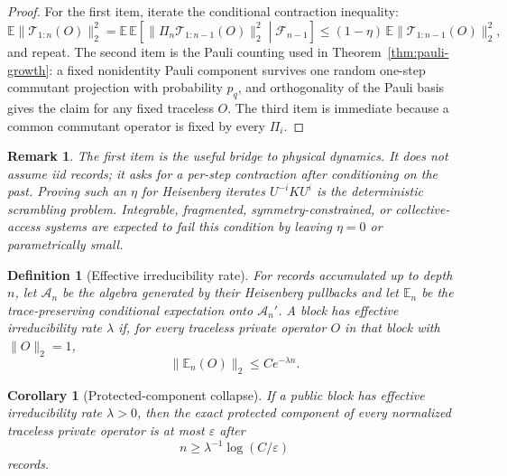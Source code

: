 \documentclass[11pt]{article}
\newtheorem{corollary}{Corollary}
\newtheorem{definition}{Definition}
\newtheorem{remark}{Remark}
\newcommand{\cA}{\mathcal A}
\newcommand{\cT}{\mathcal T}
\begin{document}
\begin{proof}
For the first item, iterate the conditional contraction inequality:
\begin{equation}
  \mathbb E\lVert \cT_{1:n}(O)\rVert_2^2
  =
  \mathbb E\,
  \mathbb E\!\left[
    \lVert \Pi_n\cT_{1:n-1}(O)\rVert_2^2
    \middle| \mathcal F_{n-1}
  \right]
  \le
  (1-\eta)\,
  \mathbb E\lVert \cT_{1:n-1}(O)\rVert_2^2 ,
\end{equation}
and repeat.  The second item is the Pauli counting used in
Theorem~\ref{thm:pauli-growth}: a fixed nonidentity Pauli component
survives one random one-step commutant projection with probability
$p_q$, and orthogonality of the Pauli basis gives the claim for any
fixed traceless $O$.  The third item is immediate because a common
commutant operator is fixed by every $\Pi_i$.
\end{proof}

\begin{remark}
The first item is the useful bridge to physical dynamics.  It does not
assume iid records; it asks for a per-step contraction after conditioning
on the past.  Proving such an $\eta$ for Heisenberg iterates
$U^{-i}KU^i$ is the deterministic scrambling problem.  Integrable,
fragmented, symmetry-constrained, or collective-access systems are
expected to fail this condition by leaving $\eta=0$ or parametrically
small.
\end{remark}

\begin{definition}[Effective irreducibility rate]
For records accumulated up to depth $n$, let $\cA_n$ be the algebra
generated by their Heisenberg pullbacks and let $\mathbb E_n$ be the
trace-preserving conditional expectation onto $\cA_n'$.  A block has
effective irreducibility rate $\lambda$ if, for every traceless private
operator $O$ in that block with $\lVert O\rVert_2=1$,
\begin{equation}
  \lVert \mathbb E_n(O)\rVert_2
  \le
  C e^{-\lambda n}.
\end{equation}
\end{definition}

\begin{corollary}[Protected-component collapse]
\label{cor:rate}
If a public block has effective irreducibility rate $\lambda>0$, then
the exact protected component of every normalized traceless private
operator is at most $\varepsilon$ after
\begin{equation}
  n
  \ge
  \lambda^{-1}\log(C/\varepsilon)
\end{equation}
records.
\end{corollary}
\end{document}

